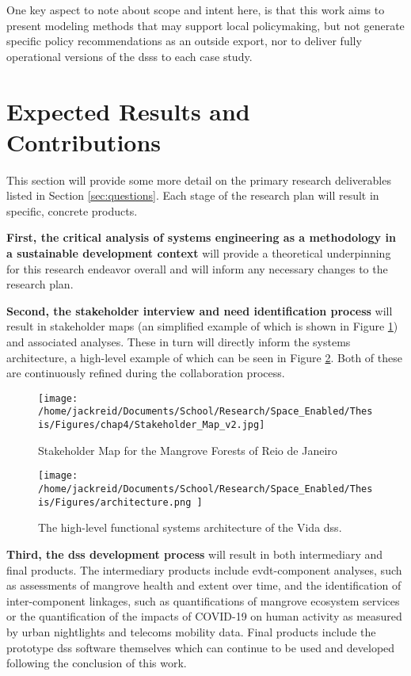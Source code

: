 \documentclass[notitlepage]{article}
\begin{document}
One key aspect to note about scope and intent here, is that this work aims to present modeling methods that may support local policymaking, but not generate specific policy recommendations as an outside export, nor to deliver fully operational versions of the \acp{dss} to each case study. 

\section{Expected Results and Contributions}

This section will provide some more detail on the primary research deliverables listed in Section \ref{sec:questions}. Each stage of the research plan will result in specific, concrete products.

\textbf{First, the critical analysis of systems engineering as a methodology in a sustainable development context} will provide a theoretical underpinning for this research endeavor overall and will inform any necessary changes to the research plan.

\textbf{Second, the stakeholder interview and need identification process} will result in stakeholder maps (an simplified example of which is shown in Figure \ref{fig:rio_stakemap}) and associated analyses. These in turn will directly inform the systems architecture, a high-level example of which can be seen in Figure \ref{fig:architecture}. Both of these are continuously refined during the collaboration process.

\begin{figure}[h]
	\centering
	\texttt{[image: /home/jackreid/Documents/School/Research/Space\_Enabled/Thesis/Figures/chap4/Stakeholder\_Map\_v2.jpg]}
	\caption[Stakeholder Map for the Mangrove Forests of Reio de Janeiro]{Stakeholder Map for the Mangrove Forests of Reio de Janeiro}
	\label{fig:rio_stakemap}
\end{figure}

\begin{figure}[h]
	\centering
	\texttt{[image: /home/jackreid/Documents/School/Research/Space\_Enabled/Thesis/Figures/architecture.png
]}
	\caption{The high-level functional systems architecture of the Vida \ac{dss}.}
	\label{fig:architecture}
\end{figure}


\textbf{Third, the \ac{dss} development process} will result in both intermediary and final products. The intermediary products include \ac{evdt}-component analyses, such as assessments of mangrove health and extent over time, and the identification of inter-component linkages, such as quantifications of mangrove ecosystem services or the quantification of the impacts of COVID-19 on human activity as measured by urban nightlights and telecoms mobility data. Final products include the prototype \ac{dss} software themselves which can continue to be used and developed following the conclusion of this work.
\end{document}
